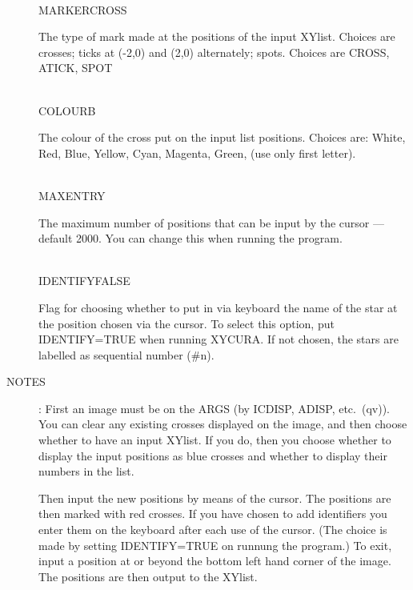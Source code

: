 \begin{description}
\begin{tabbing}
\begin{minipage}[t]{100mm}
\end{minipage}\\
MARKER\>CROSS\>\begin{minipage}[t]{100mm}
The type of mark made at the positions of the input XYlist.
Choices are crosses; ticks at (-2,0) and (2,0) alternately; spots.
Choices are CROSS, ATICK, SPOT
\end{minipage}\\
COLOUR\>B\>\begin{minipage}[t]{100mm}
The colour of the cross put on the input list positions.
Choices are: White, Red, Blue, Yellow, Cyan, Magenta, Green, (use only first
letter).
\end{minipage}\\
MAXENTRY\>\begin{minipage}[t]{100mm}
The maximum number of positions that can be input by the cursor --- default
2000.
You can change this when running the program.
\end{minipage}\\
IDENTIFY\>FALSE\>\begin{minipage}[t]{100mm}
Flag for choosing whether to put in via keyboard the name of the star at the
position chosen via the cursor.
To select this option, put IDENTIFY=TRUE when running XYCURA.
If not chosen, the stars are labelled as sequential number (\#n).
\end{minipage}
\end{tabbing}
\item [NOTES]:
First an image must be on the ARGS (by ICDISP, ADISP, etc.\ (qv)).
You can clear any existing crosses displayed on the image, and then choose
whether to have an input XYlist.
If you do, then you choose whether to display the input positions as blue
crosses and whether to display their numbers in the list.

Then input the new positions by means of the cursor.
The positions are then marked with red crosses.
If you have chosen to add identifiers you enter them on the keyboard after each
use of the cursor.
(The choice is made by setting IDENTIFY=TRUE on runnung the program.)
To exit, input a position at or beyond the bottom left hand corner of the image.
The positions are then output to the XYlist.


\end{description}

